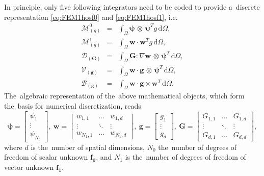 \documentclass[preprint,12pt]{elsarticle}
\newcommand{\vect}[1]{\boldsymbol{#1}}
\newcommand{\matr}[1]{\mathbf{#1}}
\newcommand{\dI}{\text{d}}
\newcommand{\vfzero}{\vect{f_0}}
\newcommand{\fone}{\vect{f_1}}
\newcommand{\intO}{\int_{\Omega}}
\newcommand{\IM}{\boldsymbol{\mathcal{M}}}
\newcommand{\ID}{\boldsymbol{\mathcal{D}}}
\newcommand{\IV}{\boldsymbol{\mathcal{V}}}
\newcommand{\IB}{\boldsymbol{\mathcal{B}}}
\newcommand{\Wzero}{\psi}
\newcommand{\Wone}{\matr{w}}
\newcounter{bla}
\begin{document}
In principle, only five following integrators need to be coded to provide
a~discrete representation \eqref{eq:FEM1hosf0} and \eqref{eq:FEM1hosf1}, i.e.
\begin{eqnarray}
  \IM^0_{(g)} &=& \intO\vect{\Wzero}\, \otimes\, \vect{\Wzero}^T g\, \dI \Omega ,
  \label{eq:IM0}\\
  \IM^1_{(g)} &=& \intO\Wone \cdot \Wone^T g\, \dI\Omega ,
  \label{eq:IM1}\\
  \ID_{(\matr{G})} &=& \intO \matr{G} : \nabla\Wone
  \, \otimes\, \vect{\Wzero}^T\, \dI \Omega ,
  \label{eq:ID}\\
  \IV_{(\vect{g})} &=& \intO\Wone \cdot
  \vect{g}\, \otimes\, \vect{\Wzero}^T\, \dI \Omega ,
  \label{eq:IV}\\
  \IB_{(\vect{g})} &=& \intO\Wone \cdot
  \vect{g} \times \Wone^T\, \dI \Omega .
  \label{eq:IB}
\end{eqnarray}
The~algebraic representation of the~above mathematical objects, which
form the~basis for numerical discretization, reads 
\begin{equation}
  \vect{\Wzero} = \begin{bmatrix}
    \Wzero_{1} \\
	\vdots   \\
	\Wzero_{N_0}
  \end{bmatrix},~
  \Wone = \begin{bmatrix}
    w_{1, 1} & \hdots & w_{1, d} \\
	\vdots   & \ddots & \vdots \\
	w_{N_1, 1} & \hdots & w_{N_1, d}
  \end{bmatrix},~
  \vect{g} = \begin{bmatrix}
    g_{1} \\
	\vdots   \\
	g_{d}
  \end{bmatrix},~
  \matr{G} = \begin{bmatrix}
    G_{1, 1} & \hdots & G_{1, d} \\
	\vdots   & \ddots & \vdots \\
	G_{d, 1} & \hdots & G_{d, d}
  \end{bmatrix},
\end{equation}
where $d$ is the~number of spatial dimensions, $N_0$ the~number of
degrees of freedom of scalar unknown $\vfzero$, and $N_1$ is the~number
of degrees of freedom of vector unknown $\fone$.
\end{document}

